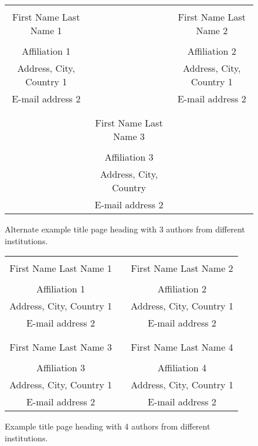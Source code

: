 \documentclass{scspaperproc}
\theoremstyle{scsthe}
\begin{document}
\begin{figure*}[htb]
{
\centering
\begin{tabular}{ccc}
\phantom{This adjusts spacing - ignore} & \phantom{This adjusts spacing - ignore} & \phantom{This adjusts spacing - ignore} \\
First Name Last Name 1 & & First Name Last Name 2 \\
\\
Affiliation 1 & & Affiliation 2 \\
Address, City, Country 1 & & Address, City, Country 1 \\
E-mail address 2 & & E-mail address 2 \\
\\
\\
& First Name Last Name 3 \\
\\
& Affiliation 3\\
& Address, City, Country \\
& E-mail address 2 
\end{tabular}
\caption{Alternate example title page heading with 3 authors from different institutions. \label{fig3different}}
}
\end{figure*}

\begin{figure*}[htb]
{
\centering
\begin{tabular}{ccc}
\phantom{Adjust spacing using these entries} & \phantom{intermediate space} & \phantom{Adjust spacing using these entries} \\
First Name Last Name 1 & & First Name Last Name 2 \\
\\
Affiliation 1 & & Affiliation 2 \\
Address, City, Country 1 & & Address, City, Country 1 \\
E-mail address 2 & & E-mail address 2 \\
\\ \\
First Name Last Name 3 & & First Name Last Name 4 \\
\\
Affiliation 3 & & Affiliation 4 \\
Address, City, Country 1 & & Address, City, Country 1 \\
E-mail address 2 & & E-mail address 2 
\end{tabular}
\caption{Example title page heading with 4 authors from different institutions.\label{fig4different}}
}
\end{figure*}
\end{document}
